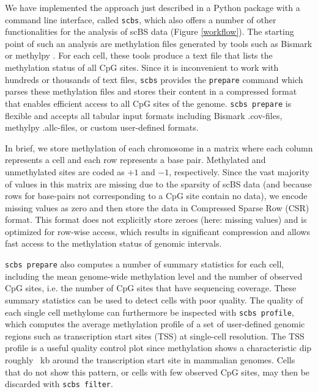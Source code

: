 \documentclass[twocolumn,10pt]{article}
\begin{document}
We have implemented the approach just described in a Python package with a command line interface, called \texttt{scbs}, which also offers a number of other functionalities for the analysis of scBS data (Figure \ref{workflow}). The starting point of such an analysis are methylation files generated by tools such as Bismark \citep{bismark} or methylpy \citep{methylpy}. For each cell, these tools produce a text file that lists the methylation status of all CpG sites. Since it is inconvenient to work with hundreds or thousands of text files, \texttt{scbs} provides the \texttt{prepare} command which parses these methylation files and stores their content in a compressed format that enables efficient access to all CpG sites of the genome. \texttt{scbs prepare} is flexible and accepts all tabular input formats including Bismark .cov-files, methylpy .allc-files, or custom user-defined formats.

In brief, we store methylation of each chromosome in a matrix where each column represents a cell and each row represents a base pair. Methylated and unmethylated sites are coded as $+1$ and $-1$, respectively. Since the vast majority of values in this matrix are missing due to the sparsity of scBS data (and because rows for base-pairs not corresponding to a CpG site contain no data), we encode missing values as zero and then store the data in Compressed Sparse Row (CSR) format. This format does not explicitly store zeroes (here: missing values) and is optimized for row-wise access, which results in significant compression and allows fast access to the methylation status of genomic intervals.

\texttt{scbs prepare} also computes a number of summary statistics for each cell, including the mean genome-wide methylation level and the number of observed CpG sites, i.e. the number of CpG sites that have sequencing coverage. These summary statistics can be used to detect cells with poor quality. The quality of each single cell methylome can furthermore be inspected with \texttt{scbs profile}, which computes the average methylation profile of a set of user-defined genomic regions such as transcription start sites (TSS) at single-cell resolution. The TSS profile is a useful quality control plot since methylation shows a characteristic dip roughly ~kb around the transcription start site in mammalian genomes. Cells that do not show this pattern, or cells with few observed CpG sites, may then be discarded with \texttt{scbs filter}. 
\end{document}
